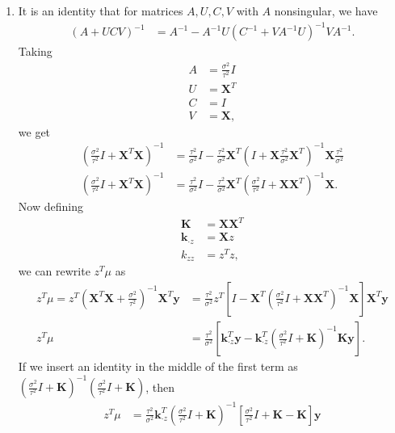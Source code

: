 \documentclass[11pt,letterpaper]{article}
\theoremstyle{definition}
\theoremstyle{plain}
\renewcommand{\vec}[1]{\bm{#1}}
\numberwithin{equation}{section}
\numberwithin{figure}{section}
\begin{document}
\begin{enumerate}
\begin{enumerate}
		\item It is an identity that for matrices $A,U,C,V$ with $A$ nonsingular, we have
		\begin{align*}
			(A+UCV)^{-1} &= A^{-1} - A^{-1}U\left(C^{-1} + V A^{-1} U \right)^{-1} V A^{-1}.
		\end{align*}
		Taking
		\begin{align*}
			A &= \frac{\sigma^2}{\tau^2} I\\
			U &= \vec{X}^T\\
			C &= I\\
			V &= \vec{X},
		\end{align*}
		we get
		\begin{align*}
			\left(\frac{\sigma^2}{\tau^2} I + \vec{X}^T \vec{X}\right)^{-1} &= \frac{\tau^2}{\sigma^2} I - \frac{\tau^2}{\sigma^2} \vec{X}^T \left(I + \vec{X} \frac{\tau^2}{\sigma^2} \vec{X}^T\right)^{-1} \vec{X} \frac{\tau^2}{\sigma^2}\\
			\left(\frac{\sigma^2}{\tau^2} I + \vec{X}^T \vec{X}\right)^{-1} &= \frac{\tau^2}{\sigma^2} I - \frac{\tau^2}{\sigma^2} \vec{X}^T \left(\frac{\sigma^2}{\tau^2} I + \vec{X}\vec{X}^T\right)^{-1} \vec{X}.
		\end{align*}
		Now defining
		\begin{align*}
			\vec{K} &= \vec{X}\vec{X}^T\\
			\vec{k}_{\cdot z} &= \vec{X} z\\
			k_{zz} &= z^T z,
		\end{align*}
		we can rewrite $z^T \mu$ as
		\begin{align*}
			z^T \mu = z^T \left(\vec{X}^T \vec{X} + \frac{\sigma^2}{\tau^2}\right)^{-1} \vec{X}^T \vec{y} &= \frac{\tau^2}{\sigma^2} z^T \left[I - \vec{X}^T \left(\frac{\sigma^2}{\tau^2} I + \vec{X} \vec{X}^T\right)^{-1} \vec{X}\right]\vec{X}^T \vec{y}\\
			z^T \mu &= \frac{\tau^2}{\sigma^2} \left[\vec{k}_{\cdot z}^T \vec{y} - \vec{k}_{\cdot z}^T \left(\frac{\sigma^2}{\tau^2}I + \vec{K}\right)^{-1} \vec{K} \vec{y}\right].
		\end{align*}
		If we insert an identity in the middle of the first term as $(\tfrac{\sigma^2}{\tau^2} I + \vec{K})^{-1} (\tfrac{\sigma^2}{\tau^2} I + \vec{K})$, then
		\begin{align*}
			z^T \mu &= \frac{\tau^2}{\sigma^2} \vec{k}_{\cdot z}^T \left(\frac{\sigma^2}{\tau^2} I + \vec{K}\right)^{-1} \left[\frac{\sigma^2}{\tau^2} I + \vec{K} - \vec{K}\right]\vec{y}\\

\end{align*}
\end{enumerate}
\end{enumerate}
\end{document}
